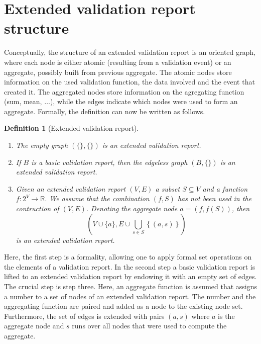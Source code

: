 \documentclass[a4paper, 11pt,titlepage]{article}
\newtheorem{definition}{Definition}
\begin{document}
\section{Extended validation report structure}
Conceptually, the structure of an extended validation report is an oriented
graph, where each node is either atomic (resulting from a validation event) or
an aggregate, possibly built from previous aggregate. The atomic nodes store
information on the used validation function, the data involved and the event
that created it. The aggregated nodes store information on the agregating
function (sum, mean, $\ldots$), while the edges indicate which nodes were used
to form an aggregate. Formally, the definition can  now be written as follows.
%
\begin{definition}[Extended validation report]\leavevmode
\label{def:extvalrep}
\begin{enumerate}
\item The empty graph $(\{\},\{\})$ is an extended validation report.
\item If $B$ is a basic validation report, then the edgeless graph $(B, \{\})$
is an extended validation report.
\item Given an extended validation report $(V,E)$  a subset $S\subseteq V$ and
a function $f:2^V\to\mathbb{R}$. We assume that the combination $(f,S)$ has not
been used in the contruction of $(V,E)$. Denoting the aggregate node
$a=(f,f(S))$, then 
\begin{displaymath}
\left(
V\cup \{a\}, E\cup \bigcup_{s\in S}\left\{( a, s )\right\}
\right)
\end{displaymath}
is an extended validation report.
\end{enumerate}
\end{definition}
Here, the first step is a formality, allowing one to apply formal set
operations on the elements of a validation report. In the second step a basic
validation report is lifted to an extended validation report by endowing it
with an empty set of edges. The crucial step is step three. Here, an aggregate
function is assumed that assigns a number to a set of nodes of an extended
validation report. The number and the aggregating function are paired and added
as a node to the existing node set. Furthermore, the set of edges is extended
with pairs $(a,s)$ where $a$ is the aggregate node and $s$ runs over all nodes
that were used to compute the aggregate. 
\end{document}
